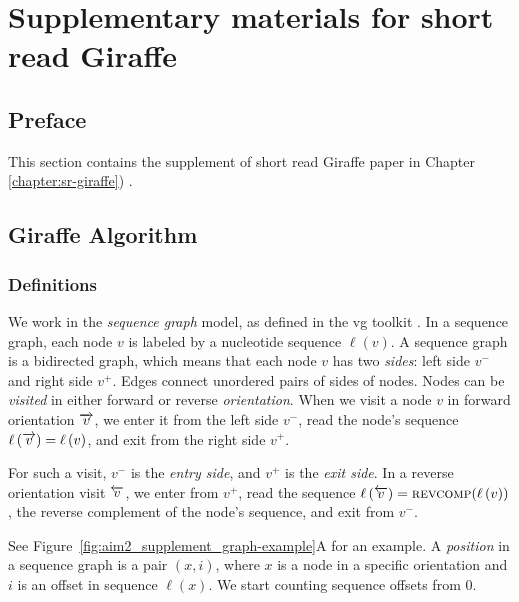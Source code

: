 \documentclass[11pt]{ucscthesis}
\newcommand{\nodelabel}[1]{\ensuremath{\ell\left( #1 \right)}}
\newcommand{\leftside}[1]{\ensuremath{{ #1 }^{-}}}
\newcommand{\rightside}[1]{\ensuremath{{ #1 }^{+}}}
\newcommand{\forwardnode}[1]{\ensuremath{\protect\overrightarrow{ #1 }}}
\newcommand{\reversenode}[1]{\ensuremath{\protect\overleftarrow{ #1 }}}
\newcommand{\reversecomplement}[1]{\ensuremath{\textsc{revcomp}({ #1 })}}
\newcommand{\vocab}[1]{\emph{#1}}
\begin{document}
\appendix
\chapter{Supplementary materials for short read Giraffe}
\label{sec:appendix_sr_giraffe}
\section{Preface}
This section contains the supplement of short read Giraffe paper in Chapter \ref{chapter:sr-giraffe}) \cite{sr_giraffe_2021}. 

\section{Giraffe Algorithm}
\label{subsec:aim2:giraffe-methods}
\subsection{Definitions}

We work in the \vocab{sequence graph} model, as defined in the vg toolkit \cite{garrison_vg_2018}.
In a sequence graph, each node $v$ is labeled by a nucleotide sequence $\nodelabel{v}$.
A sequence graph is a bidirected graph, which means that each node $v$ has two \vocab{sides}: left side $\leftside{v}$ and right side $\rightside{v}$.
Edges connect unordered pairs of sides of nodes.
Nodes can be \vocab{visited} in either forward or reverse \vocab{orientation}.
When we visit a node $v$ in forward orientation $\forwardnode{v}$, we enter it from the left side $\leftside{v}$, read the node's sequence $\nodelabel{\forwardnode{v}} = \nodelabel{v}$, and exit from the right side $\rightside{v}$.

For such a visit, $\leftside{v}$ is the \vocab{entry side}, and $\rightside{v}$ is the \vocab{exit side}.
In a reverse orientation visit $\reversenode{v}$, we enter from $\rightside{v}$, read the sequence $\nodelabel{\reversenode{v}} = \reversecomplement{\nodelabel{v}}$, the reverse complement of the node's sequence, and exit from $\leftside{v}$.
\ifdefined\HCode
    \par
\fi
See Figure~\ref{fig:aim2_supplement_graph-example}A for an example.
A \vocab{position} in a sequence graph is a pair $(x, i)$, where $x$ is a node in a specific orientation and $i$ is an offset in sequence $\nodelabel{x}$.
We start counting sequence offsets from $0$.
\end{document}

